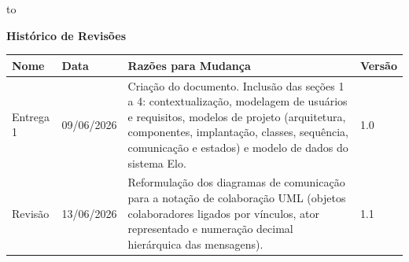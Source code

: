 \documentclass[12pt, a4paper]{article}
\begin{document}
\thispagestyle{capa}
\setcounter{page}{1}

\noindent\vbox to 

\newpage

\setcounter{page}{2}

\tableofcontents

\vspace{18pt}
\vspace{24pt}
{\fontsize{18}{22}\selectfont\bfseries Histórico de Revisões}\par
\vspace{12pt}

\begin{tabularx}{\textwidth}{|L{3.2cm}|L{2.2cm}|X|L{2cm}|}
  \hline
  \textbf{Nome} & \textbf{Data} & \textbf{Razões para Mudança} & \textbf{Versão} \\
  \hline
  Entrega 1 & 09/06/2026 & Criação do documento. Inclusão das seções 1 a 4: contextualização, modelagem de usuários e requisitos, modelos de projeto (arquitetura, componentes, implantação, classes, sequência, comunicação e estados) e modelo de dados do sistema Elo. & 1.0 \\[4pt]
  \hline
  Revisão & 13/06/2026 & Reformulação dos diagramas de comunicação para a notação de colaboração UML (objetos colaboradores ligados por vínculos, ator representado e numeração decimal hierárquica das mensagens). & 1.1 \\[4pt]
  \hline
\end{tabularx}
\end{document}
